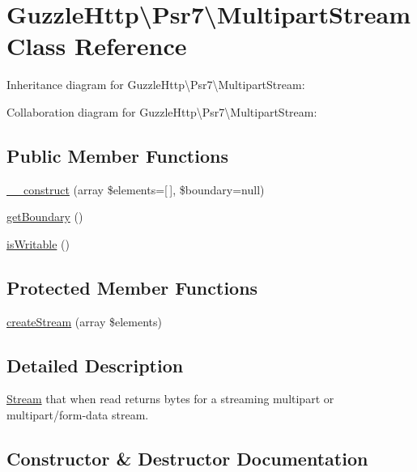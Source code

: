 \hypertarget{classGuzzleHttp_1_1Psr7_1_1MultipartStream}{}\section{Guzzle\+Http\textbackslash{}Psr7\textbackslash{}Multipart\+Stream Class Reference}
\label{classGuzzleHttp_1_1Psr7_1_1MultipartStream}


Inheritance diagram for Guzzle\+Http\textbackslash{}Psr7\textbackslash{}Multipart\+Stream\+:


Collaboration diagram for Guzzle\+Http\textbackslash{}Psr7\textbackslash{}Multipart\+Stream\+:
\subsection*{Public Member Functions}
\begin{DoxyCompactItemize}
\item 
\hyperlink{classGuzzleHttp_1_1Psr7_1_1MultipartStream_a7ecc12d435ca17f546f46a1bc84b50ae}{\+\_\+\+\_\+construct} (array \$elements=\mbox{[}$\,$\mbox{]}, \$boundary=null)
\item 
\hyperlink{classGuzzleHttp_1_1Psr7_1_1MultipartStream_a7efdca423f1aeb7c541b5e01688848b3}{get\+Boundary} ()
\item 
\hyperlink{classGuzzleHttp_1_1Psr7_1_1MultipartStream_a7062382f637d4b6b2b953040c916dde9}{is\+Writable} ()
\end{DoxyCompactItemize}
\subsection*{Protected Member Functions}
\begin{DoxyCompactItemize}
\item 
\hyperlink{classGuzzleHttp_1_1Psr7_1_1MultipartStream_a0dc55922dcdfe96b546c7c7630d08892}{create\+Stream} (array \$elements)
\end{DoxyCompactItemize}


\subsection{Detailed Description}
\hyperlink{classGuzzleHttp_1_1Psr7_1_1Stream}{Stream} that when read returns bytes for a streaming multipart or multipart/form-\/data stream. 

\subsection{Constructor \& Destructor Documentation}
\mbox{\label{classGuzzleHttp_1_1Psr7_1_1MultipartStream_a7ecc12d435ca17f546f46a1bc84b50ae}} 
